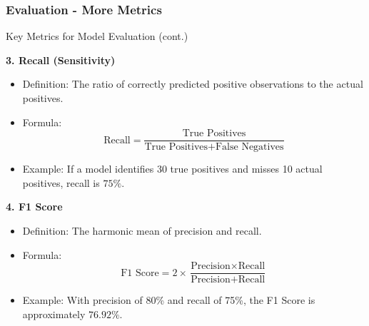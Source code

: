\documentclass[aspectratio=169]{beamer}
\begin{document}
\begin{frame}[fragile]
    \frametitle{Evaluation - More Metrics}
    \begin{block}{Key Metrics for Model Evaluation (cont.)}

        \textbf{3. Recall (Sensitivity)}
        \begin{itemize}
            \item Definition: The ratio of correctly predicted positive observations to the actual positives.
            \item Formula:
            \begin{equation}
                \text{Recall} = \frac{\text{True Positives}}{\text{True Positives} + \text{False Negatives}}
            \end{equation}
            \item Example: If a model identifies 30 true positives and misses 10 actual positives, recall is \(75\%\).
        \end{itemize}

        \textbf{4. F1 Score}
        \begin{itemize}
            \item Definition: The harmonic mean of precision and recall.
            \item Formula:
            \begin{equation}
                \text{F1 Score} = 2 \times \frac{\text{Precision} \times \text{Recall}}{\text{Precision} + \text{Recall}}
            \end{equation}
            \item Example: With precision of 80\% and recall of 75\%, the F1 Score is approximately \(76.92\%\).
        \end{itemize}

    \end{block}
\end{frame}
\end{document}
